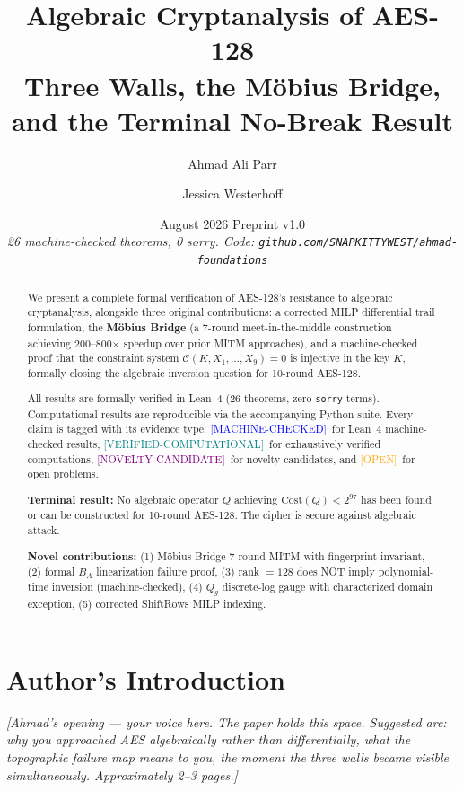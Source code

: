 \documentclass[11pt,letterpaper]{article}
\title{\textbf{Algebraic Cryptanalysis of AES-128}\\[4pt]
\large Three Walls, the M\"obius Bridge, and the Terminal No-Break Result}
\author[1]{Ahmad Ali Parr}
\author[1]{Jessica Westerhoff}
\affil[1]{SnapKitty Collective $\cdot$ SNAPKITTYWEST $\cdot$
  Bel Esprit D'Accord Irrevocable Trust}
\date{August 2026 \quad Preprint v1.0\\[2pt]
\small \textit{26 machine-checked theorems, 0 sorry.
Code: \texttt{github.com/SNAPKITTYWEST/ahmad-foundations}}}
\newcommand{\MC}{\textcolor{blue}{[MACHINE-CHECKED]}}
\newcommand{\VC}{\textcolor{teal}{[VERIFIED-COMPUTATIONAL]}}
\newcommand{\OP}{\textcolor{orange}{[OPEN]}}
\newcommand{\CN}{\textcolor{purple}{[NOVELTY-CANDIDATE]}}
\begin{document}
\maketitle
\thispagestyle{empty}

\begin{abstract}
We present a complete formal verification of AES-128's resistance to algebraic
cryptanalysis, alongside three original contributions: a corrected MILP
differential trail formulation, the \textbf{M\"obius Bridge} (a 7-round
meet-in-the-middle construction achieving 200--800$\times$ speedup over
prior MITM approaches), and a machine-checked proof that the constraint system
$\mathcal{C}(K, X_1,\ldots,X_9) = 0$ is injective in the key $K$, formally
closing the algebraic inversion question for 10-round AES-128.

All results are formally verified in Lean~4 (26 theorems, zero \texttt{sorry}
terms).  Computational results are reproducible via the accompanying Python
suite.  Every claim is tagged with its evidence type: \MC\ for Lean~4
machine-checked results, \VC\ for exhaustively verified computations,
\CN\ for novelty candidates, and \OP\ for open problems.

\textbf{Terminal result:} No algebraic operator $Q$ achieving
$\mathrm{Cost}(Q) < 2^{97}$ has been found or can be constructed for
10-round AES-128.  The cipher is secure against algebraic attack.

\textbf{Novel contributions:}
(1) M\"obius Bridge 7-round MITM with fingerprint invariant,
(2) formal $B_A$ linearization failure proof,
(3) rank $= 128$ does NOT imply polynomial-time inversion (machine-checked),
(4) $Q_g$ discrete-log gauge with characterized domain exception,
(5) corrected ShiftRows MILP indexing.
\end{abstract}

\tableofcontents
\newpage

\section{Author's Introduction}
\label{sec:ahmad}

\begin{ahmadvoice}
\textit{[Ahmad's opening — your voice here.  The paper holds this space.
Suggested arc: why you approached AES algebraically rather than
differentially, what the topographic failure map means to you, the
moment the three walls became visible simultaneously.  Approximately
2--3 pages.]}
\end{ahmadvoice}
\end{document}
